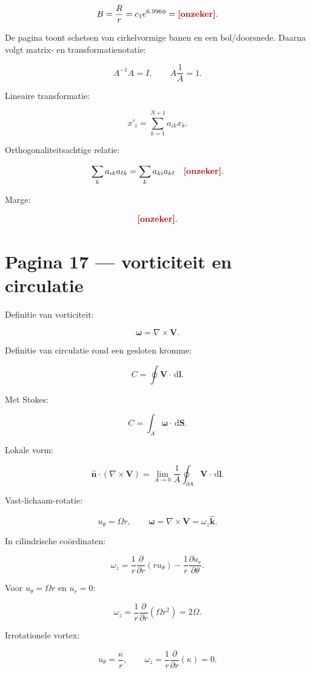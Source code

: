 \documentclass[11pt,a4paper]{article}
\newcommand{\onzeker}[1]{\ifmmode\text{\color{red!70!black}\bfseries[onzeker]}\else\textcolor{red!70!black}{\textbf{[onzeker:} #1\textbf{]}}\fi}
\newcommand{\vect}[1]{\mathbf{#1}}
\newcommand{\dd}{\,\mathrm{d}}
\begin{document}
$$
B
=
\frac{R}{r}
=
c_1 e^{6.996\phi}
=
\onzeker{-274.07496}.
$$

De pagina toont schetsen van cirkelvormige banen en een bol/doorsnede. Daarna volgt matrix- en transformatienotatie:

$$
A^{-1}A=I,
\qquad
A\frac{1}{A}=1.
$$

Lineaire transformatie:

$$
x'_i
=
\sum_{k=1}^{N+1}
a_{ik}x_k.
$$

Orthogonaliteitsachtige relatie:

$$
\sum_k a_{ik}a_{\ell k}
=
\sum_k a_{ki}a_{k\ell}
\quad
\onzeker{\text{notatie deels onzeker}}.
$$

Marge:

$$
\onzeker{\text{Clifford}=\text{Real Numbers}}.
$$

\newpage

\section*{Pagina 17 --- vorticiteit en circulatie}
Definitie van vorticiteit:

$$
\bm{\omega}
=
\nabla\times\vect{V}.
$$

Definitie van circulatie rond een gesloten kromme:

$$
C
=
\oint \vect{V}\cdot\dd\vect{l}.
$$

Met Stokes:

$$
C
=
\int_A \bm{\omega}\cdot\dd\vect{S}.
$$

Lokale vorm:

$$
\hat{\vect{n}}\cdot(\nabla\times\vect{V})
=
\lim_{A\to 0}
\frac{1}{A}
\oint_{\partial A}\vect{V}\cdot\dd\vect{l}.
$$

Vast-lichaam-rotatie:

$$
u_\theta=\Omega r,
\qquad
\bm{\omega}=\nabla\times\vect{V}=\omega_z\hat{\vect{k}}.
$$

In cilindrische coördinaten:

$$
\omega_z
=
\frac{1}{r}
\frac{\partial}{\partial r}
(r u_\theta)
-
\frac{1}{r}\frac{\partial u_r}{\partial \theta}.
$$

Voor $u_\theta=\Omega r$ en $u_r=0$:

$$
\omega_z
=
\frac{1}{r}\frac{\partial}{\partial r}(\Omega r^2)
=
2\Omega.
$$

Irrotationele vortex:

$$
u_\theta=\frac{\kappa}{r},
\qquad
\omega_z
=
\frac{1}{r}\frac{\partial}{\partial r}(\kappa)
=
0.
$$
\end{document}
